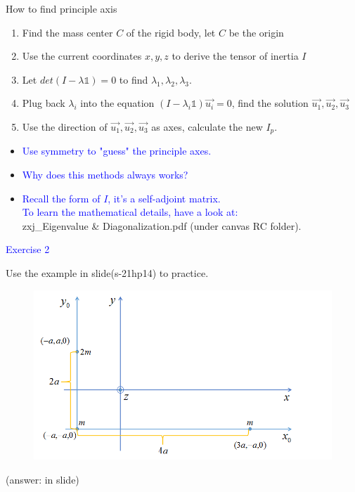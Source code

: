 \documentclass{beamer}
\begin{document}
\begin{frame}{How to find principle axis}
  \begin{enumerate}
    \item Find the mass center $C$ of the rigid body, let $C$ be the origin\pause
    \item Use the current coordinates $x, y, z$ to derive the tensor of inertia $I$\pause
    \item Let $det(I-\lambda \mathbb{1}) = 0$ to find $\lambda_1, \lambda_2, \lambda_3$.\pause
    \item Plug back $\lambda_i$ into the equation $(I - \lambda_i\mathbb{1})\vec{u_i} = 0$, find the solution $\vec{u_1},\vec{u_2},\vec{u_3}$\pause
    \item Use the direction of $\vec{u_1},\vec{u_2},\vec{u_3}$ as axes, calculate the new $I_p$.
  \end{enumerate}

  
  \begin{itemize}
    \item \textcolor{blue}{Use symmetry to "guess" the principle axes.}\pause
    \item \textcolor{blue}{Why does this methods always works?}\pause
    \item \textcolor{blue}{Recall the form of $I$, it's a self-adjoint matrix.\\
    To learn the mathematical details, have a look at:}\\ 
    zxj\_Eigenvalue \& Diagonalization.pdf (under canvas RC folder).
  \end{itemize}
\end{frame}

\begin{frame}
\textcolor{blue}{Exercise 2}

Use the example in slide(s-21hp14) to practice.
\begin{figure}[htbp]
\centering
\includegraphics[width=0.5 \linewidth, angle =0]{ex2.png}
\label{fig:8}
\end{figure}
(answer: in slide)
\end{frame}
\end{document}

